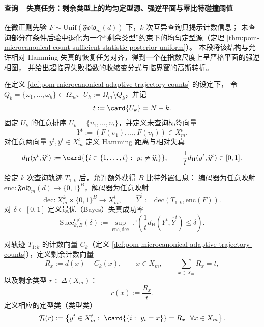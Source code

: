 
\paragraph{查询—失真任务：剩余类型上的均匀定型源、强逆平面与零比特碰撞阈值}
在微正则先验 \(F\sim\mathrm{Unif}(\mathfrak{Fold}_m(d))\) 下，\(k\) 次互异查询只揭示计数信息；
未查询部分在条件后验中退化为一个“剩余类型”约束下的均匀定型源（定理 \ref{thm:pom-microcanonical-count-sufficient-statistic-posterior-uniform}）。
本段将该结构与允许相对 Hamming 失真的恢复任务对齐，得到一个在指数尺度上呈严格平面的强逆相图，
并给出超临界失败指数的收缩变分式与临界窗的高斯转折。

\begin{definition}\label{def:pom-microcanonical-query-distortion-setup}
在定义 \ref{def:pom-microcanonical-adaptive-trajectory-counts} 的设定下，
令 \(Q_k=\{\omega_1,\dots,\omega_k\}\subset\Omega_m\)、\(U_k:=\Omega_m\setminus Q_k\)，并记
\[
t:=\card{U_k}=N-k.
\]
固定 \(U_k\) 的任意排序 \(U_k=\{\upsilon_1,\dots,\upsilon_t\}\)，并定义未查询标签向量
\[
Y^t:=(F(\upsilon_1),\dots,F(\upsilon_t))\in X_m^t.
\]
对任意两向量 \(y^t,\widehat y^t\in X_m^t\) 定义 Hamming 距离与相对失真
\[
d_{\mathrm H}(y^t,\widehat y^t):=\card{\{i\in\{1,\dots,t\}:\ y_i\neq \widehat y_i\}},
\qquad
\frac{1}{t}d_{\mathrm H}(y^t,\widehat y^t)\in[0,1].
\]
\end{definition}

\begin{definition}[查询 + 外置信息下的失真成功率]\label{def:pom-microcanonical-query-distortion-success}
给定 \(k\) 次查询轨迹 \(T_{1:k}\) 后，允许额外获得 \(B\) 比特外置信息：
编码器为任意映射 \(\mathrm{enc}:\mathfrak{Fold}_m(d)\to\{0,1\}^B\)，解码器为任意映射
\[
\mathrm{dec}:X_m^k\times\{0,1\}^B\to X_m^t,
\qquad
\widehat Y^t:=\mathrm{dec}(T_{1:k},\mathrm{enc}(F)).
\]
对 \(\delta\in[0,1]\) 定义最优（Bayes）失真成功率
\[
\mathrm{Succ}^{\mathrm{opt}}_{k,B}(\delta)
:=\sup_{\mathrm{enc},\mathrm{dec}}\ \mathbb{P}\!\left(\frac{1}{t}d_{\mathrm H}(Y^t,\widehat Y^t)\le \delta\right).
\]
\end{definition}

\begin{definition}\label{def:pom-microcanonical-residual-type-class}
对轨迹 \(T_{1:k}\) 的计数向量 \(C_k\)（定义 \ref{def:pom-microcanonical-adaptive-trajectory-counts}），定义剩余计数向量
\[
R_x:=d(x)-C_k(x),\qquad x\in X_m,
\qquad
\sum_{x\in X_m}R_x=t,
\]
以及剩余类型 \(r\in\Delta(X_m)\)：
\[
r(x):=\frac{R_x}{t}.
\]
定义相应的定型类（类型类）
\[
\mathcal{T}_t(r):=\left\{y^t\in X_m^t:\ \card{\{i:\ y_i=x\}}=R_x\ \ \forall x\in X_m\right\}.
\]
\end{definition}

